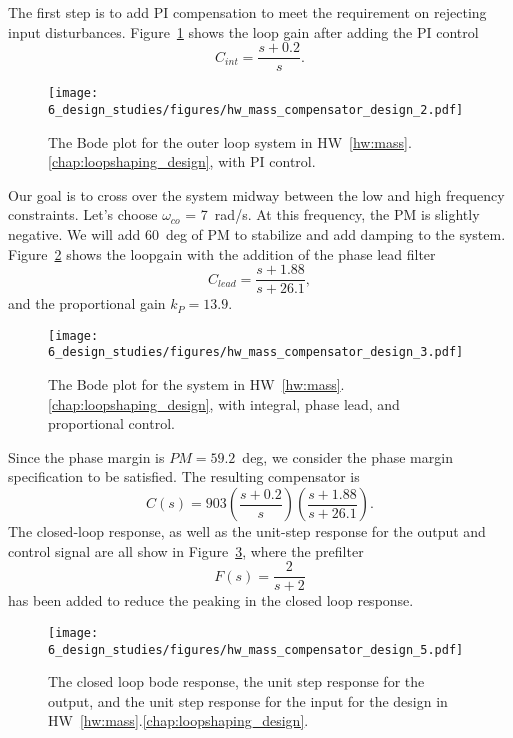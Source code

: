 The first step is to add PI compensation to meet the requirement on rejecting input disturbances.  Figure~\ref{fig:hw_mass_compensator_design_2} shows the loop gain after adding the PI control
\[
C_{int} = \frac{s+0.2}{s}.
\]
\begin{figure}[H]
   \centering
   \texttt{[image: 6\_design\_studies/figures/hw\_mass\_compensator\_design\_2.pdf]}
   \caption{The Bode plot for the outer loop system in HW~\ref{hw:mass}.\ref{chap:loopshaping_design}, with PI control.}
   \label{fig:hw_mass_compensator_design_2}
\end{figure}
Our goal is to cross over the system midway between the low and high frequency constraints. Let's choose $\omega_{co}$ = 7~rad/s. At this frequency, the PM is slightly negative. We will add 60~deg of PM to stabilize and add damping to the system. Figure~\ref{fig:hw_mass_compensator_design_3} shows the loopgain with the addition of the phase lead filter
\[
C_{lead} = \frac{s+1.88}{s+26.1},
\]
and the proportional gain $k_P=13.9$.
\begin{figure}[H]
   \centering
   \texttt{[image: 6\_design\_studies/figures/hw\_mass\_compensator\_design\_3.pdf]}
   \caption{The Bode plot for the system in HW~\ref{hw:mass}.\ref{chap:loopshaping_design}, with integral, phase lead, and proportional control.}
   \label{fig:hw_mass_compensator_design_3}
\end{figure}
%
Since the phase margin is $PM=59.2$~deg, we consider the phase margin specification to be satisfied.
The resulting compensator is
\[
C(s) = 903 \left(\frac{s+0.2}{s}\right)\left(\frac{s+1.88}{s+26.1}\right).
\]
The closed-loop response, 
as well as the unit-step response for the output and control signal are all show in Figure~\ref{fig:hw_mass_compensator_design_5}, where the prefilter
\[
F(s) = \frac{2}{s+2}
\]
has been added to reduce the peaking in the closed loop response.
\begin{figure}[H]
   \centering
   \texttt{[image: 6\_design\_studies/figures/hw\_mass\_compensator\_design\_5.pdf]}
   \caption{The closed loop bode response, the unit step response for the output, and the unit step response for the input for the design in HW~\ref{hw:mass}.\ref{chap:loopshaping_design}.}
   \label{fig:hw_mass_compensator_design_5}
\end{figure}

